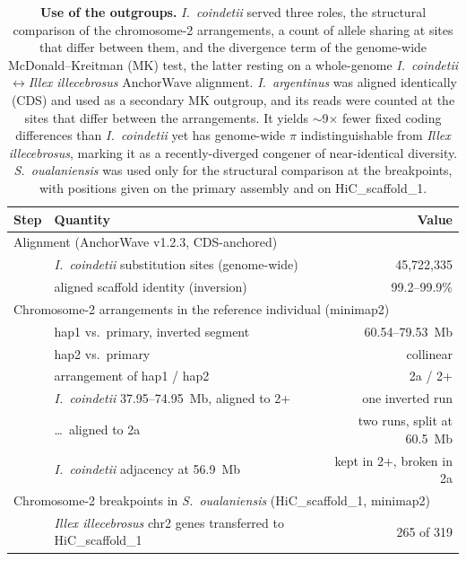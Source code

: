 \documentclass[11pt]{article}
\newcommand{\illex}{\textit{Illex illecebrosus}}
\newcommand{\coin}{\textit{I.\ coindetii}}
\begin{document}
\begin{table}[h]\centering
  \caption{\textbf{Use of the outgroups.} \coin{} served three roles, the structural comparison of
    the chromosome-2 arrangements, a count of allele sharing at sites that differ between them, and the divergence term of the genome-wide McDonald--Kreitman (MK) test, the latter resting on a whole-genome \coin$\leftrightarrow$\illex{} AnchorWave alignment.
    \textit{I.\ argentinus} was aligned identically (CDS) and used as a secondary MK outgroup, and its reads were counted at the sites that differ between the arrangements. It yields
    $\sim$9$\times$ fewer fixed coding differences than \coin{} yet has genome-wide $\pi$ indistinguishable
    from \illex{}, marking it as a recently-diverged congener of near-identical diversity. \textit{S.~oualaniensis} was used only for the structural comparison at the breakpoints, with positions given on the primary assembly and on HiC\_scaffold\_1.}
  \label{stab:coindetii}
  \small
  \begin{tabular}{llr}
    \toprule
    Step & Quantity & Value \\
    \midrule
    \multicolumn{3}{l}{Alignment (AnchorWave v1.2.3, CDS-anchored)} \\
    \quad & \coin{} substitution sites (genome-wide) & 45{,}722{,}335 \\
    \quad & aligned scaffold identity (inversion) & 99.2--99.9\% \\
    \midrule
    \multicolumn{3}{l}{Chromosome-2 arrangements in the reference individual (minimap2)} \\
    \quad & hap1 vs.\ primary, inverted segment & 60.54--79.53~Mb \\
    \quad & hap2 vs.\ primary & collinear \\
    \quad & arrangement of hap1 / hap2 & 2a / 2+ \\
    \quad & \coin{} 37.95--74.95~Mb, aligned to 2+ & one inverted run \\
    \quad & \dots\ aligned to 2a & two runs, split at 60.5~Mb \\
    \quad & \coin{} adjacency at 56.9~Mb & kept in 2+, broken in 2a \\
    \midrule
    \multicolumn{3}{l}{Chromosome-2 breakpoints in \textit{S.~oualaniensis} (HiC\_scaffold\_1, minimap2)} \\
    \quad & \illex{} chr2 genes transferred to HiC\_scaffold\_1 & 265 of 319 \\

\end{tabular}
\end{table}
\end{document}
